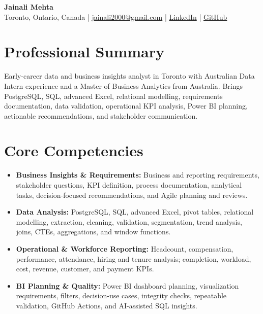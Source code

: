\documentclass[letterpaper,10pt]{article}
\begin{document}
\begin{center}
  {\fontsize{17}{19}\selectfont\textbf{Jainali Mehta}}\\[2pt]
  \small Toronto, Ontario, Canada \;|\;
  \href{mailto:jainali2000@gmail.com}{jainali2000@gmail.com} \;|\;
  \href{https://www.linkedin.com/in/jainali-mehta}{LinkedIn} \;|\;
  \href{https://github.com/jainalimehta}{GitHub}
\end{center}
\vspace{-7pt}

\section{Professional Summary}
\small Early-career data and business insights analyst in Toronto with Australian Data Intern experience and a Master of Business Analytics from Australia. Brings PostgreSQL, SQL, advanced Excel, relational modelling, requirements documentation, data validation, operational KPI analysis, Power BI planning, actionable recommendations, and stakeholder communication.

\section{Core Competencies}
\begin{itemize}[leftmargin=0.16in,label=\textbullet,topsep=0pt,itemsep=1pt,parsep=0pt]
  \item \small \textbf{Business Insights \& Requirements:} Business and reporting requirements, stakeholder questions, KPI definition, process documentation, analytical tasks, decision-focused recommendations, and Agile planning and reviews.
  \item \small \textbf{Data Analysis:} PostgreSQL, SQL, advanced Excel, pivot tables, relational modelling, extraction, cleaning, validation, segmentation, trend analysis, joins, CTEs, aggregations, and window functions.
  \item \small \textbf{Operational \& Workforce Reporting:} Headcount, compensation, performance, attendance, hiring and tenure analysis; completion, workload, cost, revenue, customer, and payment KPIs.
  \item \small \textbf{BI Planning \& Quality:} Power BI dashboard planning, visualization requirements, filters, decision-use cases, integrity checks, repeatable validation, GitHub Actions, and AI-assisted SQL insights.
\end{itemize}
\end{document}
